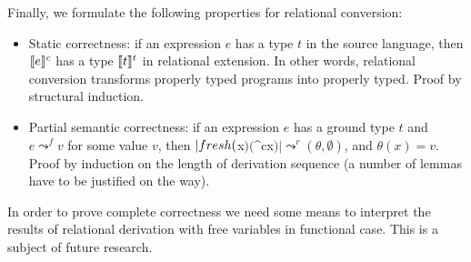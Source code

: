 Finally, we formulate the following properties for relational conversion:

\begin{itemize}
\item Static correctness: if an expression $e$ has a type $t$ in the source language, then $\llbracket{e}\rrbracket^c$ has a 
type $\llbracket{t}\rrbracket^t$ in relational extension. In other words, relational conversion transforms properly typed
programs into properly typed. Proof by structural induction.
\item Partial semantic correctness: if an expression $e$ has a ground type $t$ and $e \leadsto^f v$ for some
  value $v$, then $\lstinline|fresh($x$)($^c\;x$)| \leadsto^r (\theta,\emptyset)$, and $\theta(x)=v$. Proof
by induction on the length of derivation sequence (a number of lemmas have to be justified on the way).
\end{itemize}

In order to prove complete correctness we need some means to interpret the results of relational 
derivation with free variables in functional case. This is a subject of future research.
